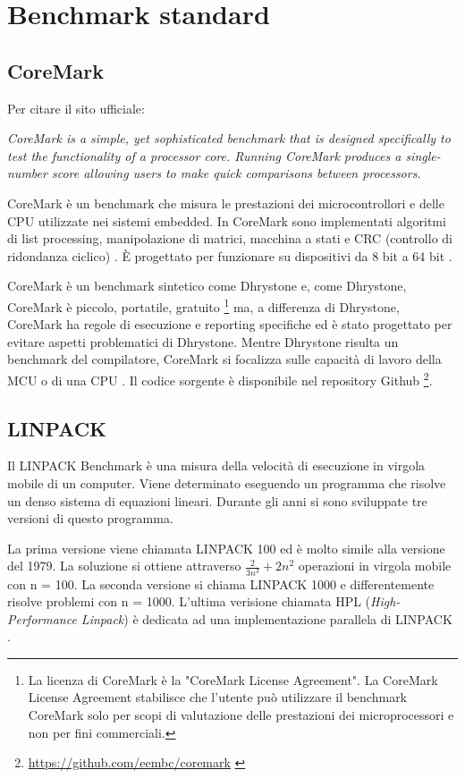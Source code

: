 \documentclass[12pt, a4paper]{report}
\begin{document}
\section{Benchmark standard}


\subsection{CoreMark}
Per citare il sito ufficiale: 

\textit{CoreMark is a simple, yet sophisticated benchmark that is designed specifically to test the functionality of a processor core. Running CoreMark produces a single-number score allowing users to make quick comparisons between processors}. 

CoreMark è un benchmark che misura le prestazioni dei microcontrollori e delle CPU utilizzate nei sistemi embedded. In CoreMark sono implementati algoritmi di list processing, manipolazione di matrici, macchina a stati e CRC (controllo di ridondanza ciclico) . È progettato per funzionare su dispositivi da 8 bit a 64 bit \cite{CoreMark}.

CoreMark è un benchmark sintetico come Dhrystone e, come Dhrystone, CoreMark è piccolo, portatile, gratuito \footnote{La licenza di CoreMark è la "CoreMark License Agreement". La CoreMark License Agreement stabilisce che l'utente può utilizzare il benchmark CoreMark solo per scopi di valutazione delle prestazioni dei microprocessori e non per fini commerciali.} ma, a differenza di Dhrystone, CoreMark ha regole di esecuzione e reporting specifiche ed è stato progettato per evitare aspetti problematici di Dhrystone. Mentre Dhrystone risulta un benchmark del compilatore, CoreMark si focalizza sulle capacità di lavoro della MCU o di una CPU \cite{analysis_EEMBC}.
Il codice sorgente è disponibile nel repository Github \footnote{\url{https://github.com/eembc/coremark} \cite{RepoCoreMark}}.
		

\subsection{LINPACK}
Il LINPACK Benchmark è una misura della velocità di esecuzione in virgola mobile di un computer. Viene determinato eseguendo un programma che risolve un denso sistema di equazioni lineari. Durante gli anni si sono sviluppate tre versioni di questo programma. 

La prima versione viene chiamata LINPACK 100 ed è molto simile alla versione del 1979. La soluzione si ottiene attraverso $ \frac{2}{3n^3} + 2n^2 $ operazioni in virgola mobile con n = 100. La seconda versione si chiama LINPACK 1000 e differentemente risolve problemi con n = 1000. L'ultima verisione chiamata HPL (\textit{High-Performance Linpack}) è dedicata ad una implementazione parallela di LINPACK\cite{LINPACK_PastPresFut} \cite{hplNetLib}.
\end{document}
